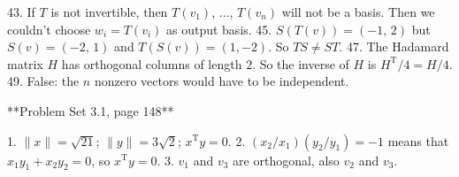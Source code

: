 43. If \(T\) is not invertible, then \(T(v_{1})\), ..., \(T(v_{n})\) will not be a basis. Then we couldn't choose \(w_{i}=T(v_{i})\) as output basis.
45. \(S(T(v))=(-1,\,2)\) but \(S(v)=(-2,\,1)\) and \(T(S(v))=(1,-2)\). So \(TS\neq ST\).
47. The Hadamard matrix \(H\) has orthogonal columns of length \(2\). So the inverse of \(H\) is \(H^{\mathrm{T}}/4=H/4\).
49. False: the \(n\) nonzero vectors would have to be independent.

**Problem Set 3.1, page 148**

1. \(\|x\|=\sqrt{21}\); \(\|y\|=3\sqrt{2}\); \(x^{\mathrm{T}}y=0\).
2. \((x_{2}/x_{1})(y_{2}/y_{1})=-1\) means that \(x_{1}y_{1}+x_{2}y_{2}=0\), so \(x^{\mathrm{T}}y=0\).
3. \(v_{1}\) and \(v_{3}\) are orthogonal, also \(v_{2}\) and \(v_{3}\).

 